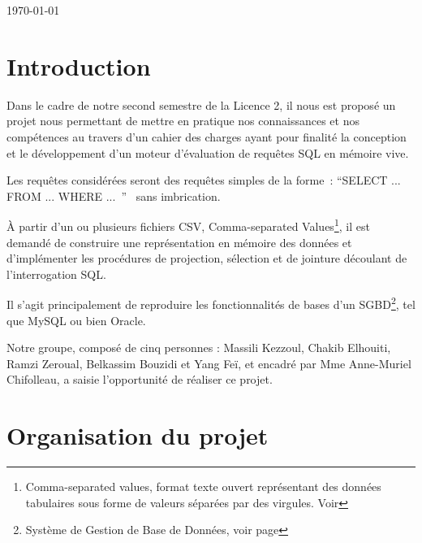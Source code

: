 \documentclass[oneside,13pt,a4paper]{report}
\begin{document}
\begin{titlepage}
	\par\vspace{1cm}

	\vfill

	{\large \today\par}
\end{titlepage}





\parskip=5pt
\chapter{Introduction}

Dans le cadre de notre second semestre de la Licence 2,
il nous est proposé un projet nous permettant de mettre en pratique nos connaissances et nos compétences
au travers d’un cahier des charges ayant pour finalité la conception et le développement d’un moteur d’évaluation de requêtes SQL en mémoire vive.

Les requêtes considérées seront des requêtes simples de la forme : \enquote{SELECT ... FROM ... WHERE ... }  sans imbrication.

À partir d’un ou plusieurs fichiers CSV, Comma-separated Values\footnote{Comma-separated values, format texte ouvert représentant des données tabulaires sous forme de valeurs séparées par des virgules. Voir \pageref{csv}},
il est demandé de construire une représentation en mémoire des données et d’implémenter les procédures de projection,
sélection et de jointure découlant de l’interrogation SQL.

Il s’agit principalement de reproduire les fonctionnalités de bases d’un SGBD\footnote{Système de Gestion de Base de Données, voir page \pageref{sgbd}}, tel que MySQL ou bien Oracle.

Notre groupe, composé de cinq personnes : Massili Kezzoul, Chakib Elhouiti, Ramzi Zeroual, Belkassim Bouzidi et Yang Feï, et encadré par Mme Anne-Muriel Chifolleau,
a saisie l'opportunité de réaliser ce projet.


\parskip=0pt
\tableofcontents

\parskip=5pt

\chapter{Organisation du projet}
\end{document}
